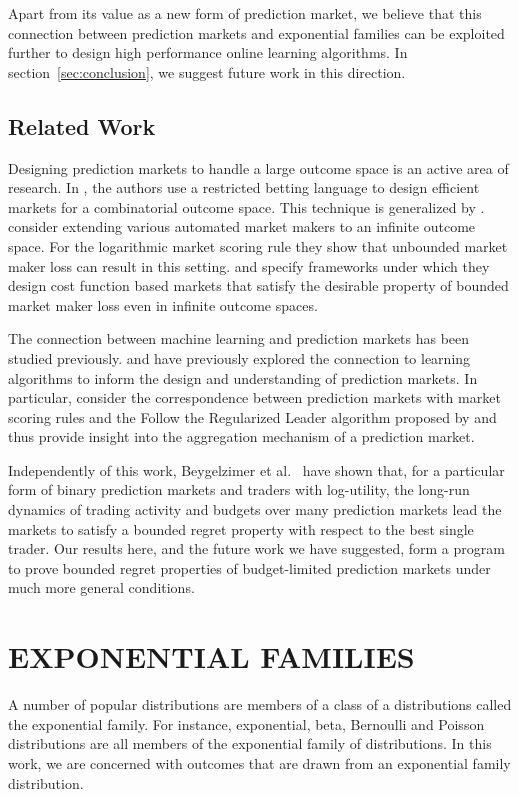 \documentclass{article}
\begin{document}
Apart from its value as a new form of prediction market, we believe that this connection between prediction markets and exponential families can be exploited further to design high performance online learning algorithms. In section~\ref{sec:conclusion}, we suggest future work in this direction. %

\subsection{Related Work}
Designing prediction markets to handle a large outcome space is an active area of research.  In \cite{Chen08}, the authors use a restricted betting language to design efficient markets for a combinatorial outcome space. This technique is generalized by \cite{Pennock11}. \cite{Gao09} consider extending various automated market makers to an infinite outcome space. For the logarithmic market scoring rule they show that unbounded market maker loss can result in this setting.   \cite{Abernethy11} and \cite{OthmanS11} specify frameworks under which they design cost function based markets that satisfy the desirable property of bounded market maker loss even in infinite outcome spaces.

The connection between machine learning and prediction markets has been studied previously. \cite{Chen10} and \cite{Abernethy11} have previously explored the connection to learning algorithms to inform the design and understanding of prediction markets. In particular, \cite{Chen10}  consider the correspondence between prediction markets with market scoring rules and the Follow the Regularized Leader algorithm proposed by \cite{Kalai05} and thus provide insight into the aggregation mechanism of a prediction market. 

Independently of this work, Beygelzimer et al.~\cite{BLP12} have shown that, for a particular form of binary prediction markets and traders with log-utility, the long-run dynamics of trading activity and budgets over many prediction markets lead the markets to satisfy a bounded regret property with respect to the best single trader. Our results here, and the future work we have suggested, form a program to prove bounded regret properties of budget-limited prediction markets under much more general conditions.

\section{EXPONENTIAL FAMILIES}
A number of popular distributions are members of a class of a distributions called the exponential family. For instance, exponential, beta, Bernoulli and Poisson distributions are all members of the exponential family of distributions. %
In this work, we are concerned with outcomes that are drawn from an exponential family distribution.
\end{document}
